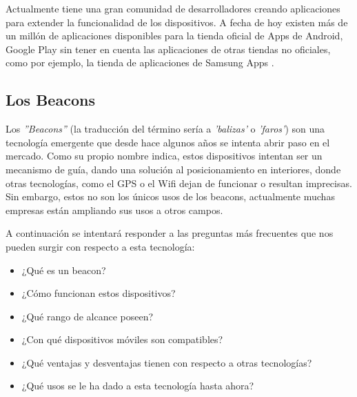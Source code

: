 Actualmente tiene una gran comunidad de desarrolladores creando aplicaciones para extender la funcionalidad de los dispositivos. A fecha de hoy existen más de un millón de aplicaciones disponibles para la tienda oficial de Apps de Android, Google Play \cite{URL::GooglePlay} sin tener en cuenta las aplicaciones de otras tiendas no oficiales, como por ejemplo, la tienda de aplicaciones de Samsung Apps \cite{URL::SamsungApps}.

\subsection{Los Beacons}

Los \textit{''Beacons''} \cite{URL::Beacon} (la traducción del término sería a \textit{'balizas'} o \textit{'faros'}) son una tecnología emergente que desde hace algunos años se intenta abrir paso en el mercado. Como su propio nombre indica, estos dispositivos intentan ser un mecanismo de guía, dando una solución al posicionamiento en interiores, donde otras tecnologías, como el GPS \cite{URL::GPS} o el Wifi dejan de funcionar o resultan imprecisas. Sin embargo, estos no son los únicos usos de los beacons, actualmente muchas empresas están ampliando sus usos a otros campos.


A continuación se intentará responder a las preguntas más frecuentes que nos pueden surgir con respecto a esta tecnología:


\begin{itemize}
\item ¿Qué es un beacon?
\item ¿Cómo funcionan estos dispositivos?
\item ¿Qué rango de alcance poseen?
\item ¿Con qué dispositivos móviles son compatibles? 
\item ¿Qué ventajas y desventajas tienen con respecto a otras tecnologías?
\item ¿Qué usos se le ha dado a esta tecnología hasta ahora?
\end{itemize}

\begin{figure}[!h]
        \begin{floatrow}
        \end{floatrow}
\end{figure}

